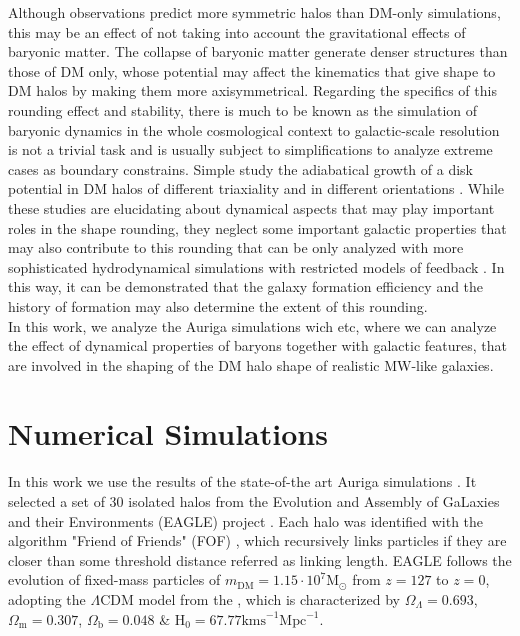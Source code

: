 \documentclass[a4paper,fleqn,usenatbib]{mnras}
\begin{document}
Although observations predict more symmetric halos than DM-only simulations, this may be an effect of not taking into account the gravitational effects of baryonic matter. The collapse of baryonic matter generate denser structures than those of DM only, whose potential may affect the kinematics that give shape to DM halos by making them more axisymmetrical. Regarding the specifics of this rounding effect and stability, there is much to be known as the simulation of baryonic dynamics in the whole cosmological context to galactic-scale resolution is not a trivial task and is usually subject to simplifications to analyze extreme cases as boundary constrains. Simple study the adiabatical growth of a disk potential in DM halos of different triaxiality and in different orientations \cite{Debattista-Moore,Debattista-Roskar}. While these studies are elucidating about dynamical aspects that may play important roles in the shape rounding, they neglect some important galactic properties that may also contribute to this rounding that can be only analyzed with more sophisticated hydrodynamical simulations with restricted models of feedback \cite{Abadi-Navarro,Bryan-Kay}. In this way, it can be demonstrated that the galaxy formation efficiency \cite{Abadi} and the history of formation may also determine the extent of this rounding.\\

In this work, we analyze the Auriga simulations wich etc, where we can analyze the effect of dynamical properties of baryons together with galactic features, that are involved in the shaping of the DM halo shape of realistic MW-like galaxies.

\section{Numerical Simulations}
In this work we use the results of the state-of-the art Auriga simulations \cite{auriga}. It selected a set of 30 isolated halos from the Evolution and Assembly of GaLaxies and their Environments (EAGLE) project \cite{Eagle}. Each halo was identified with the algorithm "Friend of Friends" (FOF) \cite{Davis_et_al._1985}, which recursively links particles if they are closer than some threshold distance referred as linking length. EAGLE follows the evolution of fixed-mass particles of $m_{\text{DM}} = 1.15\cdot 10^7\text{M}_{\odot}$ from $z=127$ to $z=0$, adopting the $\Lambda$CDM model from the \cite[Planck Collaboration et al. (2014)]{Planck_Collaboration_2014}, which is characterized by $\Omega_\Lambda=0.693$, $\Omega_\text{m}=0.307$, $\Omega_\text{b}=0.048$ \& $\text{H}_0=67.77\text{kms} ^{-1}\text{Mpc}^{-1}$. 
\end{document}
